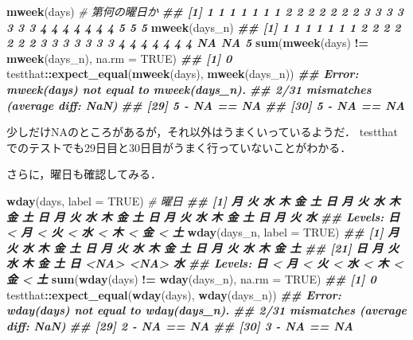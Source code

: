 \documentclass[
]{article}
\newenvironment{Shaded}{\begin{snugshade}}{\end{snugshade}}
\newcommand{\AttributeTok}[1]{\textcolor[rgb]{0.13,0.29,0.53}{#1}}
\newcommand{\CommentTok}[1]{\textcolor[rgb]{0.56,0.35,0.01}{\textit{#1}}}
\newcommand{\ConstantTok}[1]{\textcolor[rgb]{0.56,0.35,0.01}{#1}}
\newcommand{\DocumentationTok}[1]{\textcolor[rgb]{0.56,0.35,0.01}{\textbf{\textit{#1}}}}
\newcommand{\FunctionTok}[1]{\textcolor[rgb]{0.13,0.29,0.53}{\textbf{#1}}}
\newcommand{\NormalTok}[1]{#1}
\newcommand{\SpecialCharTok}[1]{\textcolor[rgb]{0.81,0.36,0.00}{\textbf{#1}}}
\begin{document}
\begin{Shaded}
\begin{Highlighting}[]
\FunctionTok{mweek}\NormalTok{(days)   }\CommentTok{\# 第何の曜日か}
\DocumentationTok{\#\# [1] 1 1 1 1 1 1 1 2 2 2 2 2 2 2 3 3 3 3 3 3 3 4 4 4 4 4 4 4 5 5 5}
\FunctionTok{mweek}\NormalTok{(days\_n)}
\DocumentationTok{\#\# [1]  1  1  1  1  1  1  1  2  2  2  2  2  2  2  3  3  3  3  3  3  3  4  4  4  4  4  4  4 NA NA  5}
\FunctionTok{sum}\NormalTok{(}\FunctionTok{mweek}\NormalTok{(days) }\SpecialCharTok{!=} \FunctionTok{mweek}\NormalTok{(days\_n), }\AttributeTok{na.rm =} \ConstantTok{TRUE}\NormalTok{)}
\DocumentationTok{\#\# [1] 0}
\NormalTok{testthat}\SpecialCharTok{::}\FunctionTok{expect\_equal}\NormalTok{(}\FunctionTok{mweek}\NormalTok{(days), }\FunctionTok{mweek}\NormalTok{(days\_n))}
\DocumentationTok{\#\# Error: mweek(days) not equal to mweek(days\_n).}
\DocumentationTok{\#\# 2/31 mismatches (average diff: NaN)}
\DocumentationTok{\#\# [29] 5 {-} NA == NA}
\DocumentationTok{\#\# [30] 5 {-} NA == NA}
\end{Highlighting}
\end{Shaded}

少しだけNAのところがあるが，それ以外はうまくいっているようだ．
testthatでのテストでも29日目と30日目がうまく行っていないことがわかる．

さらに，曜日も確認してみる．

\begin{Shaded}
\begin{Highlighting}[]
\FunctionTok{wday}\NormalTok{(days, }\AttributeTok{label =} \ConstantTok{TRUE}\NormalTok{)   }\CommentTok{\# 曜日}
\DocumentationTok{\#\#  [1] 月 火 水 木 金 土 日 月 火 水 木 金 土 日 月 火 水 木 金 土 日 月 火 水 木 金 土 日 月 火 水}
\DocumentationTok{\#\# Levels: 日 \textless{} 月 \textless{} 火 \textless{} 水 \textless{} 木 \textless{} 金 \textless{} 土}
\FunctionTok{wday}\NormalTok{(days\_n, }\AttributeTok{label =} \ConstantTok{TRUE}\NormalTok{)}
\DocumentationTok{\#\#  [1] 月   火   水   木   金   土   日   月   火   水   木   金   土   日   月   火   水   木   金   土  }
\DocumentationTok{\#\# [21] 日   月   火   水   木   金   土   日   \textless{}NA\textgreater{} \textless{}NA\textgreater{} 水  }
\DocumentationTok{\#\# Levels: 日 \textless{} 月 \textless{} 火 \textless{} 水 \textless{} 木 \textless{} 金 \textless{} 土}
\FunctionTok{sum}\NormalTok{(}\FunctionTok{wday}\NormalTok{(days) }\SpecialCharTok{!=} \FunctionTok{wday}\NormalTok{(days\_n), }\AttributeTok{na.rm =} \ConstantTok{TRUE}\NormalTok{)}
\DocumentationTok{\#\# [1] 0}
\NormalTok{testthat}\SpecialCharTok{::}\FunctionTok{expect\_equal}\NormalTok{(}\FunctionTok{wday}\NormalTok{(days), }\FunctionTok{wday}\NormalTok{(days\_n))}
\DocumentationTok{\#\# Error: wday(days) not equal to wday(days\_n).}
\DocumentationTok{\#\# 2/31 mismatches (average diff: NaN)}
\DocumentationTok{\#\# [29] 2 {-} NA == NA}
\DocumentationTok{\#\# [30] 3 {-} NA == NA}
\end{Highlighting}
\end{Shaded}
\end{document}
